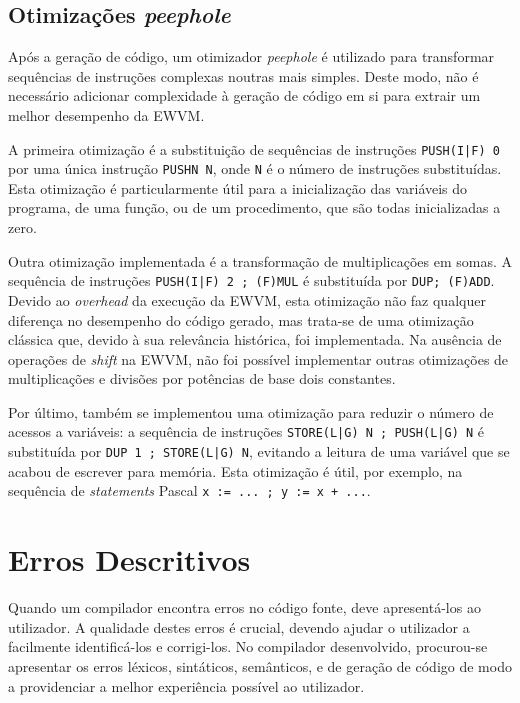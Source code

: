 \documentclass[12pt, a4paper]{article}
\begin{document}
\subsection{Otimizações \emph{peephole}}

Após a geração de código, um otimizador \emph{peephole} é utilizado para transformar sequências de
instruções complexas noutras mais simples. Deste modo, não é necessário adicionar complexidade à
geração de código em si para extrair um melhor desempenho da EWVM.

A primeira otimização é a substituição de sequências de instruções \texttt{PUSH(I|F) 0} por uma
única instrução \texttt{PUSHN N}, onde \texttt{N} é o número de instruções substituídas. Esta
otimização é particularmente útil para a inicialização das variáveis do programa, de uma função, ou
de um procedimento, que são todas inicializadas a zero.

Outra otimização implementada é a transformação de multiplicações em somas. A sequência de
instruções \texttt{PUSH(I|F) 2 ; (F)MUL} é substituída por \texttt{DUP; (F)ADD}. Devido ao
\emph{overhead} da execução da EWVM, esta otimização não faz qualquer diferença no desempenho do
código gerado, mas trata-se de uma otimização clássica que, devido à sua relevância histórica, foi
implementada. Na ausência de operações de \emph{shift} na EWVM, não foi possível implementar outras
otimizações de multiplicações e divisões por potências de base dois constantes.

Por último, também se implementou uma otimização para reduzir o número de acessos a variáveis: a
sequência de instruções \texttt{STORE(L|G) N ; PUSH(L|G) N} é substituída por
\texttt{DUP 1 ; STORE(L|G) N}, evitando a leitura de uma variável que se acabou de escrever para
memória. Esta otimização é útil, por exemplo, na sequência de \emph{statements} Pascal
\texttt{x := ... ; y := x + ...}.

\section{Erros Descritivos}

Quando um compilador encontra erros no código fonte, deve apresentá-los ao utilizador. A qualidade
destes erros é crucial, devendo ajudar o utilizador a facilmente identificá-los e corrigi-los. No
compilador desenvolvido, procurou-se apresentar os erros léxicos, sintáticos, semânticos, e de
geração de código de modo a providenciar a melhor experiência possível ao utilizador.
\end{document}
